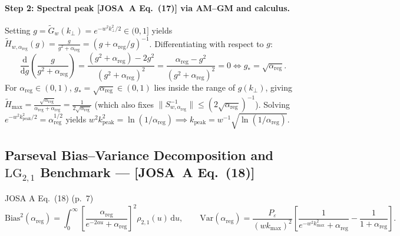 \documentclass[10pt,letterpaper]{article}
\newcommand{\norm}[1]{\lVert #1 \rVert}
\newcommand{\dd}{\mathrm{d}}
\newcommand{\josa}[1]{\textbf{[JOSA~A Eq.~(#1)]}}
\numberwithin{equation}{section}
\begin{document}
\paragraph*{Step 2: Spectral peak \josa{17} via AM--GM and calculus.}
Setting $g = \widetilde{G}_w(k_\perp) = e^{-w^2 k_\perp^2/2} \in (0,1]$ yields $\widetilde{H}_{w,\alpha_{\mathrm{reg}}}(g) = \frac{g}{g^2+\alpha_{\mathrm{reg}}} = (g + \alpha_{\mathrm{reg}}/g)^{-1}$. Differentiating with respect to $g$:
\begin{equation}
  \frac{\dd}{\dd g}\left(\frac{g}{g^2+\alpha_{\mathrm{reg}}}\right) = \frac{(g^2+\alpha_{\mathrm{reg}}) - 2g^2}{(g^2+\alpha_{\mathrm{reg}})^2} = \frac{\alpha_{\mathrm{reg}} - g^2}{(g^2+\alpha_{\mathrm{reg}})^2} = 0 \iff g_* = \sqrt{\alpha_{\mathrm{reg}}}.
\end{equation}
For $\alpha_{\mathrm{reg}} \in (0,1)$, $g_* = \sqrt{\alpha_{\mathrm{reg}}} \in (0,1)$ lies inside the range of $g(k_\perp)$, giving $\widetilde{H}_{\max} = \frac{\sqrt{\alpha_{\mathrm{reg}}}}{\alpha_{\mathrm{reg}}+\alpha_{\mathrm{reg}}} = \frac{1}{2\sqrt{\alpha_{\mathrm{reg}}}}$ (which also fixes $\norm{S_{w,\alpha_{\mathrm{reg}}}^{-1}} \le (2\sqrt{\alpha_{\mathrm{reg}}})^{-1}$). Solving $e^{-w^2 k_{\mathrm{peak}}^2/2} = \alpha_{\mathrm{reg}}^{1/2}$ yields $w^2 k_{\mathrm{peak}}^2 = \ln(1/\alpha_{\mathrm{reg}}) \implies k_{\mathrm{peak}} = w^{-1}\sqrt{\ln(1/\alpha_{\mathrm{reg}})}$.

\subsection{Parseval Bias--Variance Decomposition and $\mathrm{LG}_{2,1}$ Benchmark --- \josa{18}}
\label{sec:s5_parseval}

\begin{targeteq}{JOSA A Eq.~(18) (p.~7)}
\[
  \mathrm{Bias}^2(\alpha_{\mathrm{reg}}) = \int_0^\infty \left[\frac{\alpha_{\mathrm{reg}}}{e^{-2au}+\alpha_{\mathrm{reg}}}\right]^2 \rho_{2,1}(u)\,\dd u, \qquad
  \mathrm{Var}(\alpha_{\mathrm{reg}}) = \frac{P_\varepsilon}{(w k_{\max})^2}\left[\frac{1}{e^{-w^2 k_{\max}^2}+\alpha_{\mathrm{reg}}} - \frac{1}{1+\alpha_{\mathrm{reg}}}\right].
\]
\end{targeteq}
\end{document}
